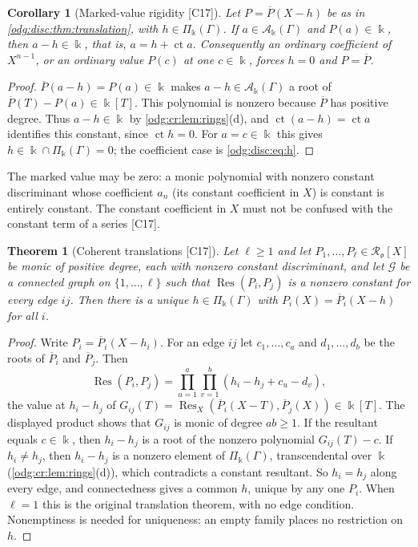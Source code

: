 \documentclass[11pt,oneside]{article}
\numberwithin{equation}{section}
\newtheorem{theorem}{Theorem}[section]
\newtheorem{corollary}[corollary]{Corollary}
\theoremstyle{definition}
\theoremstyle{remark}
\newcommand{\ct}{\operatorname{ct}}
\newcommand{\src}[1]{\textup{\textsf{\small[#1]}}}
\newcommand{\crA}{\mathcal A_\Bbbk(\Gamma)}
\newcommand{\crP}{\Pi_\Bbbk(\Gamma)}
\newcommand{\Res}{\operatorname{Res}}
\begin{document}
\begin{corollary}[Marked-value rigidity \src{C17}]\label{odg:disc:cor:marks}
Let $P=\overline P(X-h)$ be as in \cref{odg:disc:thm:translation}, with $h\in\crP$. If
$a\in\crA$ and $P(a)\in\Bbbk$, then $a-h\in\Bbbk$, that is, $a=h+\ct a$. Consequently an
ordinary coefficient of $X^{n-1}$, or an ordinary value $P(c)$ at one $c\in\Bbbk$, forces
$h=0$ and $P=\overline P$.
\end{corollary}
\begin{proof}
$\overline P(a-h)=P(a)\in\Bbbk$ makes $a-h\in\crA$ a root of
$\overline P(T)-P(a)\in\Bbbk[T]$. This polynomial is nonzero because $\overline P$ has
positive degree. Thus $a-h\in\Bbbk$ by \cref{odg:cr:lem:rings}(d), and
$\ct(a-h)=\ct a$ identifies this constant, since $\ct h=0$.
For $a=c\in\Bbbk$ this gives $h\in\Bbbk\cap\crP=0$; the coefficient case is
\eqref{odg:disc:eq:h}.
\end{proof}

The marked value may be zero: a monic polynomial with nonzero constant discriminant whose
coefficient $a_n$ (its constant coefficient in $X$) is constant is entirely constant. The
constant coefficient in $X$ must not be confused with the constant term of a series
\src{C17}.

\begin{theorem}[Coherent translations \src{C17}]\label{odg:disc:thm:resultants}
Let $\ell\ge1$ and let $P_1,\ldots,P_\ell\in\mathcal R_{\mathfrak o}[X]$ be monic of positive degree, each with
nonzero constant discriminant, and let $\mathcal G$ be a connected graph on
$\{1,\ldots,\ell\}$ such that $\Res(P_i,P_j)$ is a nonzero constant for every edge $ij$.
Then there is a unique $h\in\crP$ with $P_i(X)=\overline P_i(X-h)$ for all $i$.
\end{theorem}
\begin{proof}
Write $P_i=\overline P_i(X-h_i)$. For an edge $ij$ let $c_1,\ldots,c_a$ and
$d_1,\ldots,d_b$ be the roots of $\overline P_i$ and $\overline P_j$. Then
\[
 \Res(P_i,P_j)=\prod_{u=1}^a\prod_{v=1}^b(h_i-h_j+c_u-d_v),
\]
the value at $h_i-h_j$ of
$G_{ij}(T)=\Res_X(\overline P_i(X-T),\overline P_j(X))\in\Bbbk[T]$.
The displayed product shows that $G_{ij}$ is monic of degree $ab\ge1$.
If the resultant equals $c\in\Bbbk$, then $h_i-h_j$ is a root of the nonzero
polynomial $G_{ij}(T)-c$. If $h_i\ne h_j$, then $h_i-h_j$ is a
nonzero element of $\crP$, transcendental over $\Bbbk$ (\cref{odg:cr:lem:rings}(d)), which
contradicts a constant resultant. So $h_i=h_j$ along every edge, and connectedness gives a
common $h$, unique by any one $P_i$. When $\ell=1$ this is the original translation
theorem, with no edge condition. Nonemptiness is needed for uniqueness: an empty family
places no restriction on $h$.
\end{proof}
\end{document}
